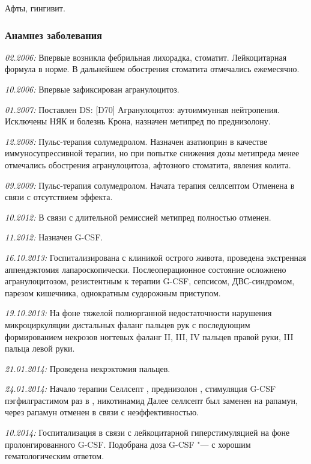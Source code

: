 \documentclass[a4paper,14pt]{extarticle}
\newcommand{\mgpkg}{мг/кг}
\newcommand{\mgpd}{мг/сут.}
\newcommand{\mugpkg}{мкг/кг}
\newcommand{\months}{мес.}
\newcommand{\weeks}{нед.}
\newcommand{\pdate}[1]{\emph{#1:} }
\newcommand{\DS}[2]{[#2] #1}
\begin{document}
Афты, гингивит.

\subsubsection*{Анамнез заболевания}

\pdate{02.2006} Впервые возникла фебрильная лихорадка, стоматит. Лейкоцитарная формула в норме. В дальнейшем обострения стоматита отмечались ежемесячно.

\pdate{10.2006} Впервые зафиксирован агранулоцитоз.

\pdate{01.2007} Поставлен DS: \DS{Агранулоцитоз: аутоиммунная нейтропения}{D70}. Исключены НЯК и болезнь Крона, назначен метипред \numprint[\mgpkg]{1} по преднизолону.

\pdate{12.2008} Пульс-терапия солумедролом. Назначен азатиоприн \numprint[\mgpkg]{2} в качестве иммуносупрессивной терапии, но при попытке снижения дозы метипреда менее \numprint[\mgpkg]{3--4} отмечались обострения агранулоцитоза, афтозного стоматита, явления колита.

\pdate{09.2009} Пульс-терапия солумедролом. Начата терапия селлсептом \numprint[\mgpd]{750} Отменена в связи с отсутствием эффекта.

\pdate{10.2012} В связи с длительной ремиссией метипред полностью отменен.

\pdate{11.2012} Назначен G-CSF.

\pdate{16.10.2013} Госпитализирована с клиникой острого живота, проведена экстренная аппендэктомия лапароскопически. Послеоперационное состояние осложнено агранулоцитозом, резистентным к терапии G-CSF, сепсисом, ДВС\hyp{}синдромом, парезом кишечника, однократным судорожным приступом.

\pdate{19.10.2013} На фоне тяжелой полиорганной недостаточности нарушения микроциркуляции дистальных фаланг пальцев рук с последующим формированием некрозов ногтевых фаланг II, III, IV пальцев правой руки, III пальца левой руки.

\pdate{21.01.2014} Проведена некрэктомия пальцев.

\pdate{24.01.2014} Начало терапии Селлсепт \numprint[\mgpd]{1000}, преднизолон \numprint[\mgpd]{7.5}, стимуляция G-CSF пэгфилграстимом  раз в \numprint[\weeks]{2}, никотинамид \numprint[\mgpd]{400} Далее селлсепт был заменен на рапамун, через \numprint[\months]{3} рапамун отменен в связи с неэффективностью.

\pdate{10.2014} Госпитализация в связи с лейкоцитарной гиперстимуляцией на фоне пролонгированного G-CSF. Подобрана доза G-CSF "--- \numprint[\mugpkg]{1} с хорошим гематологическим ответом.
\end{document}
